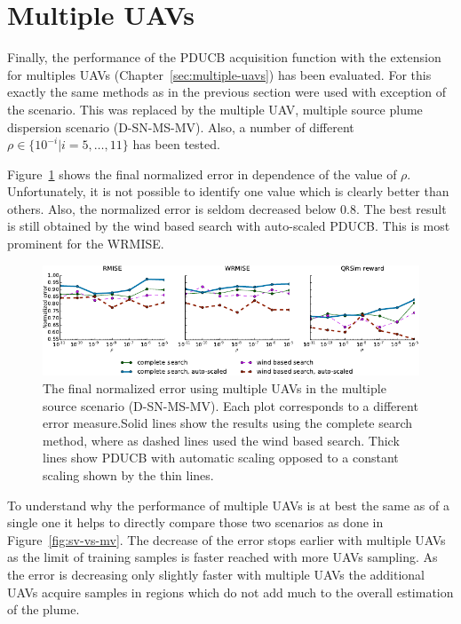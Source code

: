 \section{Multiple UAVs}
Finally, the performance of the PDUCB acquisition function with the extension 
for multiples UAVs (Chapter~\ref{sec:multiple-uavs}) has been evaluated. For 
this exactly the same methods as in the previous section were used with 
exception of the scenario. This was replaced by the multiple UAV, multiple 
source plume dispersion scenario (D-SN-MS-MV). Also, a number of different $\rho 
\in \{10^{-i} | i = 5, \dots, 11\}$ has been tested.

Figure~\ref{fig:mv-err} shows the final normalized error in dependence of the 
value of $\rho$. Unfortunately, it is not possible to identify one value which 
is clearly better than others. Also, the normalized error is seldom decreased 
below \num{0.8}. The best result is still obtained by the wind based search with 
auto-scaled PDUCB\@. This is most prominent for the WRMISE\@.

\begin{figure}
    \centering
    \includegraphics{plots/multiple-uav}
    \caption[Normalized error using multiple UAVs]{The final normalized error 
        using multiple UAVs in the multiple source scenario (D-SN-MS-MV). Each 
        plot corresponds to a different error measure.Solid lines show the 
        results using the complete search method, where as dashed lines used the 
        wind based search.  Thick lines show PDUCB with automatic scaling 
        opposed to a constant scaling shown by the thin 
        lines.}\label{fig:mv-err}
\end{figure}

To understand why the performance of multiple UAVs is at best the same as of 
a single one it helps to directly compare those two scenarios as done in 
Figure~\ref{fig:sv-vs-mv}. The decrease of the error stops earlier with multiple 
UAVs as the limit of training samples is faster reached with more UAVs sampling.  
As the error is decreasing only slightly faster with multiple UAVs the 
additional UAVs acquire samples in regions which do not add much to the overall 
estimation of the plume.

